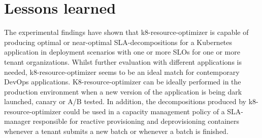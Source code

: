 \section{Lessons learned}
The experimental findings have shown that k8-resource-optimizer is capable of producing  optimal or near-optimal SLA-decompositions for a Kubernetes application in deployment scenarios with one or more SLOs for one or more tenant organizations. Whilst further evaluation with different applications is needed, k8-resource-optimizer seems to be an ideal match for contemporary DevOps applications. K8-resource-optimizer can be ideally performed in the production environment when a new version of the application is being dark launched, canary or A/B tested. In addition, the decompositions produced by k8-resource-optimizer could be used in a capacity management policy of a SLA-manager responsible for reactive provisioning and deprovisioning containers whenever a tenant submits a new batch or whenever a batch is finished.
